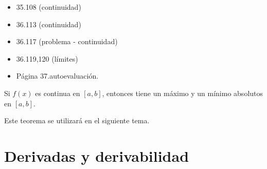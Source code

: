\begin{problem}
\begin{itemize}
	\item 35.108 (continuidad)
	\item 36.113 (continuidad)
	\item 36.117 (problema - continuidad)
	\item 36.119,120 (límites)
	\item Página 37.autoevaluación.
\end{itemize}
\solution
\end{problem}

\begin{theorem}
Si $f(x)$ es continua en $[a,b]$, entonces tiene un máximo y un mínimo absolutos en $[a,b]$.
\end{theorem}

\obs Este teorema se utilizará en el siguiente tema.



\section{Derivadas y derivabilidad}

